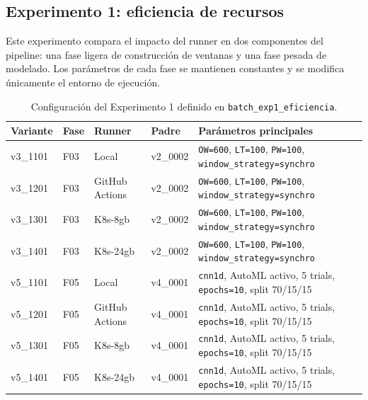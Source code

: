 \subsection{Experimento 1: eficiencia de recursos}
\label{anexo:exp1-eficiencia}

Este experimento compara el impacto del runner en dos componentes del pipeline: una fase ligera de construcción de ventanas y una fase pesada de modelado. Los parámetros de cada fase se mantienen constantes y se modifica únicamente el entorno de ejecución.

\begin{table}[htbp]
    \centering
    \caption{Configuración del Experimento 1 definido en \texttt{batch\_exp1\_eficiencia}.}
    \label{tab:params-exp1-eficiencia}
    \begin{tabular}{p{}p{}p{}p{}p{}}
        \hline
        \textbf{Variante} & \textbf{Fase} & \textbf{Runner} & \textbf{Padre} & \textbf{Parámetros principales} \\
        \hline
        v3\_1101 & F03 & Local & v2\_0002 & \texttt{OW=600}, \texttt{LT=100}, \texttt{PW=100}, \texttt{window\_strategy=synchro} \\
        v3\_1201 & F03 & GitHub Actions & v2\_0002 & \texttt{OW=600}, \texttt{LT=100}, \texttt{PW=100}, \texttt{window\_strategy=synchro} \\
        v3\_1301 & F03 & K8s-8gb & v2\_0002 & \texttt{OW=600}, \texttt{LT=100}, \texttt{PW=100}, \texttt{window\_strategy=synchro} \\
        v3\_1401 & F03 & K8s-24gb & v2\_0002 & \texttt{OW=600}, \texttt{LT=100}, \texttt{PW=100}, \texttt{window\_strategy=synchro} \\
        v5\_1101 & F05 & Local & v4\_0001 & \texttt{cnn1d}, AutoML activo, 5 trials, \texttt{epochs=10}, split 70/15/15 \\
        v5\_1201 & F05 & GitHub Actions & v4\_0001 & \texttt{cnn1d}, AutoML activo, 5 trials, \texttt{epochs=10}, split 70/15/15 \\
        v5\_1301 & F05 & K8s-8gb & v4\_0001 & \texttt{cnn1d}, AutoML activo, 5 trials, \texttt{epochs=10}, split 70/15/15 \\
        v5\_1401 & F05 & K8s-24gb & v4\_0001 & \texttt{cnn1d}, AutoML activo, 5 trials, \texttt{epochs=10}, split 70/15/15 \\
        \hline
    \end{tabular}
\end{table}

